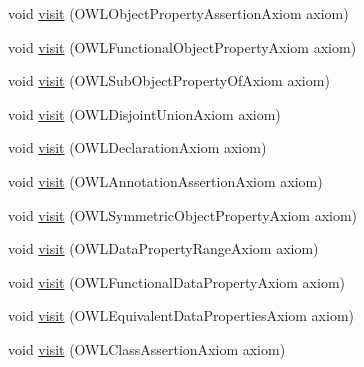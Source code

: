 \begin{DoxyCompactItemize}
\item 
void \hyperlink{classuk_1_1ac_1_1manchester_1_1cs_1_1owlapi_1_1dlsyntax_1_1_d_l_syntax_object_renderer_af6efe198f4d982f347dfd7a999b297ee}{visit} (O\-W\-L\-Object\-Property\-Assertion\-Axiom axiom)
\item 
void \hyperlink{classuk_1_1ac_1_1manchester_1_1cs_1_1owlapi_1_1dlsyntax_1_1_d_l_syntax_object_renderer_a98917db1b42b3f030a4a9604d6af5630}{visit} (O\-W\-L\-Functional\-Object\-Property\-Axiom axiom)
\item 
void \hyperlink{classuk_1_1ac_1_1manchester_1_1cs_1_1owlapi_1_1dlsyntax_1_1_d_l_syntax_object_renderer_aa1ce630295c918cd150be5fc555d6ecc}{visit} (O\-W\-L\-Sub\-Object\-Property\-Of\-Axiom axiom)
\item 
void \hyperlink{classuk_1_1ac_1_1manchester_1_1cs_1_1owlapi_1_1dlsyntax_1_1_d_l_syntax_object_renderer_a3f04d37e4b802b7277e7a41f5dd81c41}{visit} (O\-W\-L\-Disjoint\-Union\-Axiom axiom)
\item 
void \hyperlink{classuk_1_1ac_1_1manchester_1_1cs_1_1owlapi_1_1dlsyntax_1_1_d_l_syntax_object_renderer_adf4698a71b91405e25013055a0cb5e36}{visit} (O\-W\-L\-Declaration\-Axiom axiom)
\item 
void \hyperlink{classuk_1_1ac_1_1manchester_1_1cs_1_1owlapi_1_1dlsyntax_1_1_d_l_syntax_object_renderer_a00a5f961343337a602a280857e3830ae}{visit} (O\-W\-L\-Annotation\-Assertion\-Axiom axiom)
\item 
void \hyperlink{classuk_1_1ac_1_1manchester_1_1cs_1_1owlapi_1_1dlsyntax_1_1_d_l_syntax_object_renderer_ad1ef103d2bfa91c57ec158b39a1b93d5}{visit} (O\-W\-L\-Symmetric\-Object\-Property\-Axiom axiom)
\item 
void \hyperlink{classuk_1_1ac_1_1manchester_1_1cs_1_1owlapi_1_1dlsyntax_1_1_d_l_syntax_object_renderer_ace8e6b81582da0f83faacf40cc877682}{visit} (O\-W\-L\-Data\-Property\-Range\-Axiom axiom)
\item 
void \hyperlink{classuk_1_1ac_1_1manchester_1_1cs_1_1owlapi_1_1dlsyntax_1_1_d_l_syntax_object_renderer_ac2298a076d2ddf121d5ff2161e9b70b9}{visit} (O\-W\-L\-Functional\-Data\-Property\-Axiom axiom)
\item 
void \hyperlink{classuk_1_1ac_1_1manchester_1_1cs_1_1owlapi_1_1dlsyntax_1_1_d_l_syntax_object_renderer_af5d82c0f797e657f2cbf8956d226d9c4}{visit} (O\-W\-L\-Equivalent\-Data\-Properties\-Axiom axiom)
\item 
void \hyperlink{classuk_1_1ac_1_1manchester_1_1cs_1_1owlapi_1_1dlsyntax_1_1_d_l_syntax_object_renderer_a8153f72c3a1140d02e986c4ff74441ed}{visit} (O\-W\-L\-Class\-Assertion\-Axiom axiom)

\end{DoxyCompactItemize}
